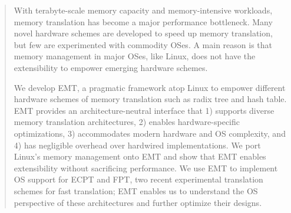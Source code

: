 \begin{abstract}
With terabyte-scale memory capacity
    and memory-intensive workloads,
memory translation has become a major performance bottleneck.
Many novel hardware schemes are
    developed to speed up memory translation, but
    few are experimented with commodity OSes.
A main reason is that memory management in major OSes, like Linux,
    does not have the extensibility
    to empower emerging hardware schemes.
    


We develop EMT, a pragmatic framework atop Linux to empower
    different hardware schemes of memory translation 
    such as radix tree and hash table.
EMT provides an architecture-neutral interface that
    1) supports diverse memory translation architectures,
    2) enables hardware-specific optimizations,
    3) accommodates modern hardware and OS complexity,
    and 4) has negligible overhead over hardwired implementations. 
We port Linux's memory management onto EMT and show that 
    EMT enables extensibility without sacrificing performance.
We use EMT to implement OS support for ECPT and FPT, two recent experimental translation 
    schemes for fast translation;
    EMT enables us to understand the OS perspective of these architectures
    and further optimize their designs.
\end{abstract}
